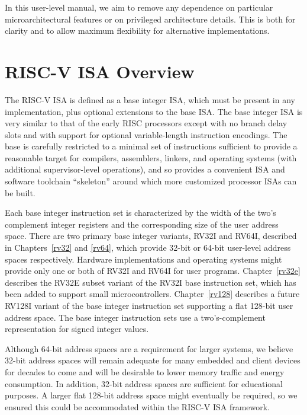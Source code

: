 \begin{commentary}
In this user-level manual, we aim to remove any dependence on
particular microarchitectural features or on privileged architecture
details.  This is both for clarity and to allow maximum flexibility
for alternative implementations.
\end{commentary}

\section{RISC-V ISA Overview}

The RISC-V ISA is defined as a base integer ISA, which must be present
in any implementation, plus optional extensions to the base ISA.  The
base integer ISA is very similar to that of the early RISC processors
except with no branch delay slots and with support for optional
variable-length instruction encodings.  The base is carefully
restricted to a minimal set of instructions sufficient to provide a
reasonable target for compilers, assemblers, linkers, and operating
systems (with additional supervisor-level operations), and so provides
a convenient ISA and software toolchain ``skeleton'' around which more
customized processor ISAs can be built.

Each base integer instruction set is characterized by the width of the two's
complement integer registers and the corresponding size of the user address
space.  There are two primary base integer variants, RV32I and RV64I,
described in Chapters~\ref{rv32} and \ref{rv64}, which provide 32-bit
or 64-bit user-level address spaces respectively.  Hardware
implementations and operating systems might provide only one or both
of RV32I and RV64I for user programs.  Chapter~\ref{rv32e} describes
the RV32E subset variant of the RV32I base instruction set, which has
been added to support small microcontrollers.  Chapter~\ref{rv128}
describes a future RV128I variant of the base integer instruction set
supporting a flat 128-bit user address space.  The base integer
instruction sets use a two's-complement representation for signed
integer values.

\begin{commentary}
Although 64-bit address spaces are a requirement for larger systems,
we believe 32-bit address spaces will remain adequate for many
embedded and client devices for decades to come and will be desirable
to lower memory traffic and energy consumption.  In addition, 32-bit
address spaces are sufficient for educational purposes.  A larger flat
128-bit address space might eventually be required, so we ensured this
could be accommodated within the RISC-V ISA framework.
\end{commentary}

